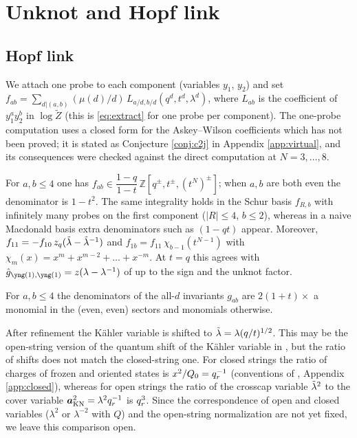 \section{Unknot and Hopf link}\label{sec:hopf}

\subsection{Hopf link}
We attach one probe to each component (variables $y_1$, $y_2$) and set $f_{ab} = \sum_{d | (a,b)} (\mu(d)/d)\, L_{a/d, b/d}(q^d, t^d, \lambda^d)$, where $L_{ab}$ is the coefficient of $y_1^a y_2^b$ in $\log\tilde Z$ (this is \eqref{eq:extract} for one probe per component). The one-probe computation uses a closed form for the Askey--Wilson coefficients which has not been proved; it is stated as Conjecture \ref{conj:c2j} in Appendix \ref{app:virtual}, and its consequences were checked against the direct computation at $N = 3, \dots, 8$.
\begin{result}\label{cr:hopf}
For $a, b \le 4$ one has $f_{ab} \in \dfrac{1 - q}{1 - t}\,\mathbb{Z}[q^\pm, t^\pm, (t^N)^\pm]$; when $a, b$ are both even the denominator is $1 - t^2$. The same integrality holds in the Schur basis $f_{R,b}$ with infinitely many probes on the first component ($|R| \le 4$, $b \le 2$), whereas in a naive Macdonald basis extra denominators such as $(1 - qt)$ appear. Moreover, $f_{11} = -f_{10}\, z_q(\tilde\lambda - \tilde\lambda^{-1})$ and $f_{1b} = f_{11}\,\chi_{b-1}(t^{N-1})$ with $\chi_m(x) = x^m + x^{m-2} + \dots + x^{-m}$. At $t = q$ this agrees with $\hat g_{\yone,\yone} = z(\lambda - \lambda^{-1})$ of \cite{Marino09} up to the sign and the unknot factor.
\end{result}
\begin{result}\label{cr:hopfdenom}
For $a, b \le 4$ the denominators of the all-$d$ invariants $g_{ab}$ are $2(1+t)\times$ a monomial in the (even, even) sectors and monomials otherwise.
\end{result}
After refinement the K\"ahler variable is shifted to $\tilde\lambda = \lambda (q/t)^{1/2}$. This may be the open-string version of the quantum shift of the K\"ahler variable in \cite{AM22}, but the ratio of shifts does not match the closed-string one. For closed strings the ratio of charges of frozen and oriented states is $x^2/Q_0 = q_r^{-1}$ (conventions of \cite{AgSc12}, Appendix \ref{app:closed}), whereas for open strings the ratio of the crosscap variable $\tilde\lambda^2$ to the cover variable $\bm{a}_{\mathrm{KN}}^2 = \lambda^2q_r^{-1}$ is $q_r^{3}$. Since the correspondence of open and closed variables ($\lambda^2$ or $\lambda^{-2}$ with $Q$) and the open-string normalization are not yet fixed, we leave this comparison open.

